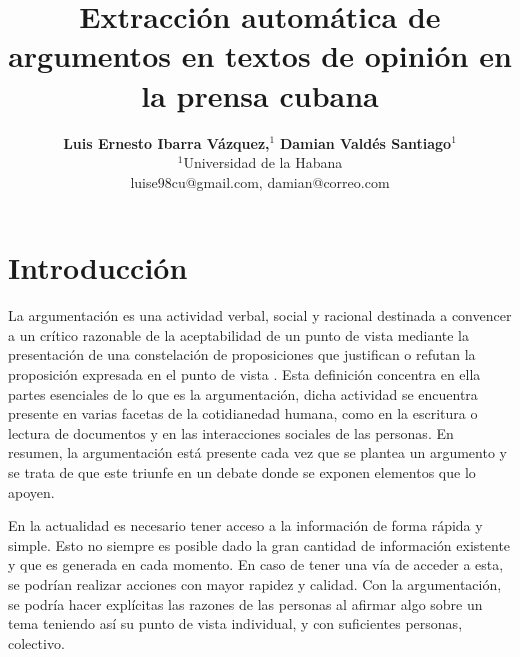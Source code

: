 \documentclass[a4paper,11pt,twocolumn,twoside]{article}
\title{Extracción automática de argumentos en textos de opinión en la prensa cubana}
\author {\textbf{Luis Ernesto Ibarra Vázquez,$^1$} \textbf{Damian Valdés Santiago$^1$}\\
$^1$Universidad de la Habana\\
luise98cu@gmail.com, damian@correo.com\\ %
}
\begin{document}

\setlength\titlebox{20cm} %


\label{firstpage} \maketitle

%

\section{Introducción}


La argumentación es una actividad verbal, social y racional destinada a convencer 
a un crítico razonable de la aceptabilidad de un punto de vista mediante la presentación 
de una constelación de proposiciones que justifican o refutan la proposición expresada 
en el punto de vista \cite{van2004systematic}. Esta definición concentra en ella 
partes esenciales de lo que es la argumentación, dicha actividad se encuentra presente
en varias facetas de la cotidianedad humana, como en la escritura o lectura de documentos y
en las interacciones sociales de las personas. En resumen, la argumentación está presente 
cada vez que se plantea un argumento y se trata de que este triunfe en un debate donde 
se exponen elementos que lo apoyen.   

En la actualidad es necesario tener acceso a la información
de forma rápida y simple. Esto no siempre es posible dado la gran cantidad de información existente y
que es generada en cada momento. En caso de tener una vía de acceder a esta, se podrían realizar acciones
con mayor rapidez y calidad. Con la argumentación, se podría hacer explícitas las razones de las personas 
al afirmar algo sobre un tema teniendo así su punto de vista individual, y con suficientes personas, colectivo.

\end{document}
